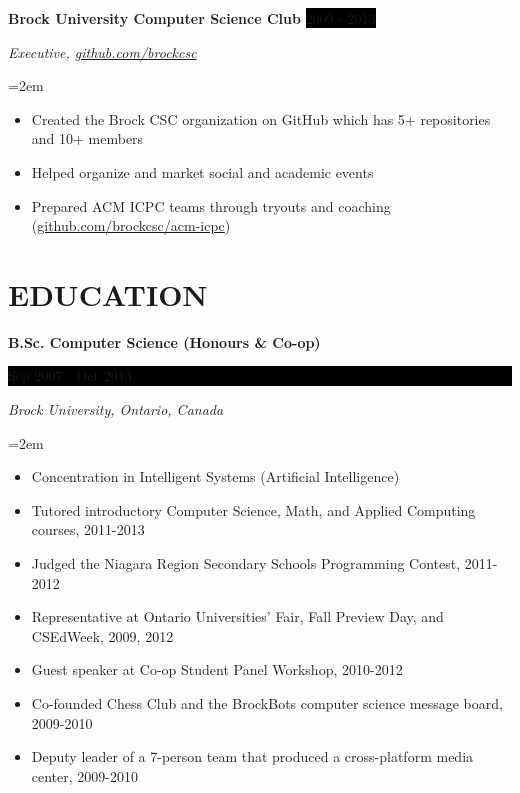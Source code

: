 \documentclass[paper=a4,fontsize=11pt]{scrartcl} %
\newcommand{\NewPart}[1]{\section*{\uppercase{#1}}}
\newcommand{\EducationEntry}[4]{
    \noindent \textbf{#1} \hfill      %
    \colorbox{Black}{
      \parbox{8.5em}{
      \hfill\color{White}#2}} \par  %
    \noindent \textit{#3} \par        %
    \noindent\hangindent=2em\hangafter=0 \small #4 %
    \normalsize \par}
\newcommand{\OrganizationEntry}[4]{         %
    \noindent \textbf{#1} \hfill            %
    \colorbox{Black}{\color{White}#2} \par  %
    \noindent \textit{#3} \par              %
    \noindent\hangindent=2em\hangafter=0 \small #4 %
    \normalsize \par}
\begin{document}
\OrganizationEntry{Brock University Computer Science Club}{2009 - 2013}
{Executive, \url{github.com/brockcsc}}
{
 \begin{itemize} \itemsep -1pt
   \item Created the Brock CSC organization on GitHub which has 5+ repositories and 10+ members
   \item Helped organize and market social and academic events
   \item Prepared ACM ICPC teams through tryouts and coaching (\url{github.com/brockcsc/acm-icpc})
 \end{itemize}
}

\NewPart{Education}{}

\EducationEntry{B.Sc. Computer Science (Honours \& Co-op)}
{Sep 2007 - Oct 2013}
{Brock University, Ontario, Canada}
{
\begin{itemize}  \itemsep -1pt %
  \item Concentration in Intelligent Systems (Artificial Intelligence)
  \item Tutored introductory Computer Science, Math, and Applied Computing courses, 2011-2013
  \item Judged the Niagara Region Secondary Schools Programming Contest, 2011-2012
  \item Representative at Ontario Universities' Fair, Fall Preview Day,
  and CSEdWeek, 2009, 2012
  \item Guest speaker at Co-op Student Panel Workshop, 2010-2012
  \item Co-founded Chess Club and the BrockBots computer science
  message board, 2009-2010
  \item Deputy leader of a 7-person team that produced a cross-platform media center, 2009-2010
\end{itemize}
}

\end{document}
